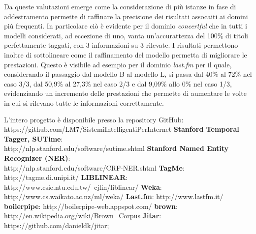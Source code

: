 \documentclass[a4paper]{report}
\begin{document}
Da queste valutazioni emerge come la considerazione di più istanze in fase di addestramento permette di raffinare la precisione dei risultati assocaiti ai domini più frequenti. In particolare ciò è evidente per il dominio \textit{concertful} che in tutti i modelli considerati, ad eccezione di uno, vanta un'accurattezza del 100\% di titoli perfettamente taggati, con 3 informazioni su 3 rilevate. I risultati permettono inoltre di sottolineare come il raffinamento del modello permetta di migliorare le prestazioni. Questo è visibile ad esempio per il dominio \textit{last.fm} per il quale, considerando il passaggio dal modello B al modello L, si passa dal 40\% al 72\% nel caso 3/3, dal 50,9\% al 27,3\% nel caso 2/3 e dal 9,09\% allo 0\% nel caso 1/3, evidenziando un incremento delle prestazioni che permette di aumentare le volte in cui si rilevano tutte le informazioni correttamente.

\cleardoublepage
\renewcommand\bibname{Riferimenti}
\begin{thebibliography}{n}
\addto\captions{\renewcommand{\thebibliography}{Riferimenti}}
 L'intero progetto è disponibile presso la repository GitHub: \\https://github.com/LM7/SistemiIntelligentiPerInternet
 \textbf{Stanford Temporal Tagger, SUTime}: \\http://nlp.stanford.edu/software/sutime.shtml
 \textbf{Stanford Named Entity Recognizer (NER)}: \\http://nlp.stanford.edu/software/CRF-NER.shtml
 \textbf{TagMe}: http://tagme.di.unipi.it/
 \textbf{LIBLINEAR}: http://www.csie.ntu.edu.tw/~cjlin/liblinear/
 \textbf{Weka}: http://www.cs.waikato.ac.nz/ml/weka/
 \textbf{Last.fm}: http://www.lastfm.it/
 \textbf{boilerpipe}: http://boilerpipe-web.appspot.com/
 \textbf{brown}: http://en.wikipedia.org/wiki/Brown\_Corpus
 \textbf{Jitar}: https://github.com/danieldk/jitar;
\end{thebibliography}
\end{document}
